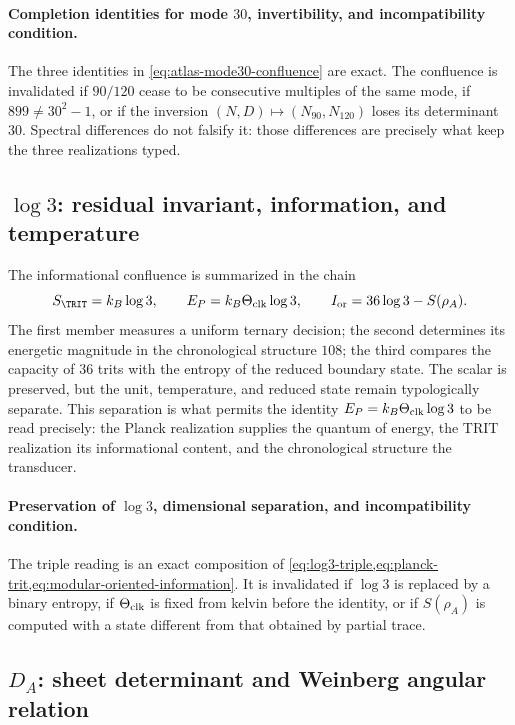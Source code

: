\paragraph{Completion identities for mode \(30\), invertibility, and incompatibility condition.}
The three identities in \cref{eq:atlas-mode30-confluence} are exact. The confluence is invalidated if \(90/120\) cease to be consecutive multiples of the same mode, if \(899\ne30^2-1\), or if the inversion \((N,D)\mapsto(N_{90},N_{120})\) loses its determinant \(30\). Spectral differences do not falsify it: those differences are precisely what keep the three realizations typed.

\subsection{\(\log3\): residual invariant, information, and temperature}

The informational confluence is summarized in the chain
\begin{equation}
S_{\TRIT}=k_B\log3,\qquad
E_P=k_B\Theta_{\rm clk}\log3,\qquad
I_{\rm or}=36\log3-S(\rho_A).
\label{eq:atlas-log3-confluence}
\end{equation}
The first member measures a uniform ternary decision; the second determines
its energetic magnitude in the chronological structure \(108\); the third compares the
capacity of \(36\) trits with the entropy of the reduced boundary state.
The scalar is preserved,
but the unit, temperature, and reduced state remain typologically
separate. This
separation is what permits the identity
\(E_P=k_B\Theta_{\rm clk}\log3\) to be read precisely: the Planck realization supplies the quantum
of energy, the TRIT realization its informational content, and the
chronological structure the transducer.

\paragraph{Preservation of \(\log 3\), dimensional separation, and incompatibility condition.}
The triple reading is an exact composition of
\cref{eq:log3-triple,eq:planck-trit,eq:modular-oriented-information}. It is
invalidated if \(\log3\) is replaced by a binary entropy, if
\(\Theta_{\rm clk}\) is fixed from kelvin before the identity, or if
\(S(\rho_A)\) is computed with a state different from that obtained by partial trace.

\subsection{\texorpdfstring{\(D_A\)}{Angular determinant}: sheet determinant and Weinberg angular relation}

